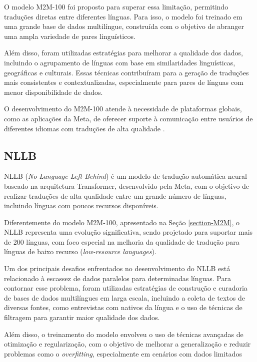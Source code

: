 O modelo M2M-100 foi proposto para superar essa limitação, permitindo traduções
diretas entre diferentes línguas. Para isso, o modelo foi treinado em uma
grande base de dados multilíngue, construída com o objetivo de abranger uma
ampla variedade de pares linguísticos.

Além disso, foram utilizadas estratégias para melhorar a qualidade dos dados,
incluindo o agrupamento de línguas com base em similaridades linguísticas,
geográficas e culturais. Essas técnicas contribuíram para a geração de
traduções mais consistentes e contextualizadas, especialmente para pares de
línguas com menor disponibilidade de dados.

O desenvolvimento do M2M-100 atende à necessidade de plataformas globais, como
as aplicações da Meta, de oferecer suporte à comunicação entre usuários de
diferentes idiomas com traduções de alta qualidade \cite{fan2020m2m100}.

\subsection{NLLB}
NLLB (\textit{No Language Left Behind}) é um modelo de tradução automática
neural baseado na arquitetura Transformer, desenvolvido pela Meta, com o
objetivo de realizar traduções de alta qualidade entre um grande número de
línguas, incluindo línguas com poucos recursos disponíveis.

Diferentemente do modelo M2M-100, apresentado na Seção \ref{section-M2M}, o
NLLB representa uma evolução significativa, sendo projetado para suportar mais
de 200 línguas, com foco especial na melhoria da qualidade de tradução para
línguas de baixo recurso (\textit{low-resource languages}).

Um dos principais desafios enfrentados no desenvolvimento do NLLB está
relacionado à escassez de dados paralelos para determinadas línguas. Para
contornar esse problema, foram utilizadas estratégias de construção e curadoria
de bases de dados multilíngues em larga escala, incluindo a coleta de textos de
diversas fontes, como entrevistas com nativos da língua e o uso de técnicas de
filtragem para garantir maior qualidade dos dados.

Além disso, o treinamento do modelo envolveu o uso de técnicas avançadas de
otimização e regularização, com o objetivo de melhorar a generalização e
reduzir problemas como o \textit{overfitting}, especialmente em cenários com
dados limitados \cite{nllbteam2022languageleftbehindscaling}

